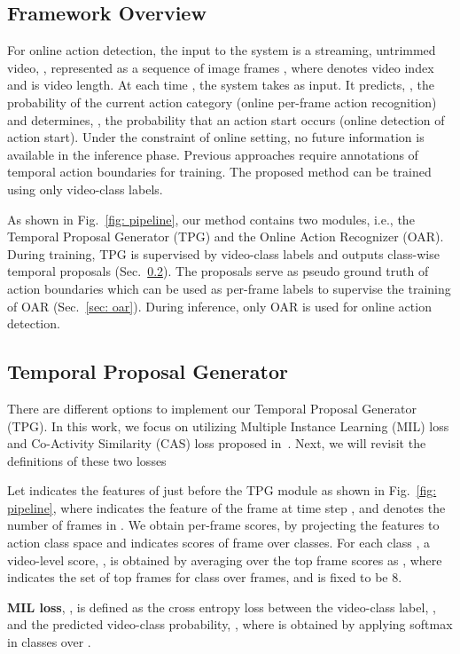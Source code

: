 \documentclass[final]{cvpr}
\begin{document}
\subsection{Framework Overview}
For online action detection, the input to the system is a streaming, untrimmed video, , represented as a sequence of image frames , where  denotes video index and  is video length. At each time , the system takes  as input. It predicts, , the probability of the current action category (online per-frame action recognition) and determines, , the probability that an action start occurs (online detection of action start). Under the constraint of online setting, no future information is available in the inference phase. Previous approaches require annotations of temporal action boundaries for training. The proposed method can be trained using only video-class labels.

As shown in Fig.~\ref{fig: pipeline}, our method contains two modules, i.e., the Temporal Proposal Generator (TPG) and the Online Action Recognizer (OAR). During training, TPG is supervised by video-class labels and outputs class-wise temporal proposals (Sec.~\ref{sec: tpg}). The proposals serve as pseudo ground truth of action boundaries which can be used as per-frame labels to supervise the training of OAR (Sec.~\ref{sec: oar}). During inference, only OAR is used for online action detection.

\subsection{Temporal Proposal Generator}
\label{sec: tpg}
There are different options to implement our Temporal Proposal Generator (TPG). In this work, we focus on utilizing Multiple Instance Learning (MIL) loss and Co-Activity Similarity (CAS) loss proposed in~\cite{paul2018w}. Next, we will revisit the definitions of these two losses

Let  indicates the features of  just before the TPG module as shown in Fig.~\ref{fig: pipeline}, where  indicates the feature of the frame at time step , and  denotes the number of frames in . We obtain per-frame scores,  by projecting the features to action class space and  indicates scores of frame  over  classes. For each class , a video-level score, , is obtained by averaging over the top  frame scores as , where  indicates the set of top  frames for class  over  frames,  and  is fixed to be 8.

\textbf{MIL loss}, , is defined as the cross entropy loss between the video-class label, , and the predicted video-class probability, , where  is obtained by applying softmax in classes over .
\end{document}
